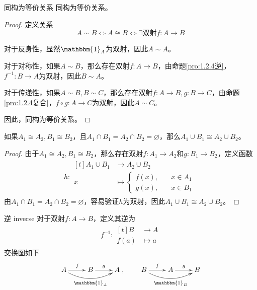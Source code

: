 \begin{proposition}{同构为等价关系}
	同构为等价关系。
\end{proposition}

\begin{proof}
	定义关系
	$$
	A\sim B \iff A\cong B \iff \exists\text{双射}f:A\to B
	$$
	
	对于反身性，显然$\mathbbm{1}_A$为双射，因此$A\sim A$。
	
	对于对称性，如果$A\sim B$，那么存在双射$f:A\to B$，由命题\ref{pro:1.2.4逆}，$f^{-1}:B\to A$为双射，因此$B\sim A$。
	
	对于传递性，如果$A\sim B,B\sim C$，那么存在双射$f:A\to B,g:B\to C$，由命题\ref{pro:1.2.4复合}，$f\circ g:A\to C$为双射，因此$A\sim C$。
	
	因此，同构为等价关系。
\end{proof}

\begin{proposition}
	如果$A_1\cong A_2,B_1\cong B_2$，且$A_1\cap B_1=A_2\cap B_2=\varnothing$，那么$A_1\cup B_1\cong A_2\cup B_2$。
\end{proposition}

\begin{proof}
	由于$A_1\cong A_2,B_1\cong B_2$，那么存在双射$f:A_1\to A_2$和$g:B_1\to B_2$，定义函数
	\begin{align*}
		h:\begin{aligned}[t]
			A_1\cup B_1&\longrightarrow A_2\cup B_2\\
			x&\longmapsto 
			\begin{cases}
				f(x),\quad & x\in A_1\\
				g(x),\quad & x\in B_1
			\end{cases}
		\end{aligned}
	\end{align*}
	由$A_1\cap B_1=A_2\cap B_2=\varnothing$，容易验证$h$为双射，因此$A_1\cup B_1\cong A_2\cup B_2$。
\end{proof}

\begin{definition}{逆 inverse}
	对于双射$f:A\to B$，定义其逆为
	\begin{align*}
		f^{-1}:\begin{aligned}[t]
			B&\longrightarrow A\\
			f(a)&\longmapsto a
		\end{aligned}
	\end{align*}
	交换图如下
	$$
	\xymatrix{
		A \ar@/_1pc/[rr]_{\mathbbm{1}_A} \ar^f[r] &B \ar^g[r] &A
	},\qquad 
	\xymatrix{
		B \ar@/_1pc/[rr]_{\mathbbm{1}_B} \ar^f[r] &A \ar^g[r] &B
	}
	$$
\end{definition}

